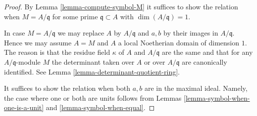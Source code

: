 \begin{proof}
By Lemma \ref{lemma-compute-symbol-M} it suffices to show the relation when
$M = A/\mathfrak q$ for some prime $\mathfrak q \subset A$ with
$\dim(A/\mathfrak q) = 1$.

\medskip\noindent
In case $M = A/\mathfrak q$ we may replace $A$ by $A/\mathfrak q$ and
$a, b$ by their images in $A/\mathfrak q$. Hence we may assume $A = M$
and $A$ a local Noetherian domain of dimension $1$. The reason is
that the residue field $\kappa$ of $A$ and $A/\mathfrak q$ are
the same and that for any $A/\mathfrak q$-module $M$ the determinant
taken over $A$ or over $A/\mathfrak q$ are canonically identified.
See Lemma \ref{lemma-determinant-quotient-ring}.

\medskip\noindent
It suffices to show the relation when both
$a, b$ are in the maximal ideal. Namely, the case where one
or both are units follows from Lemmas \ref{lemma-symbol-when-one-is-a-unit}
and \ref{lemma-symbol-when-equal}.


\end{proof}
